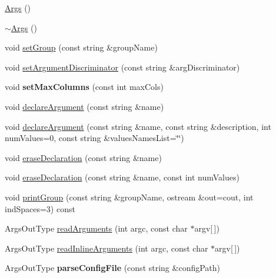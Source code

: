 \begin{DoxyCompactItemize}
\item 
\hyperlink{classnor__utils_1_1Args_ad9540079157b394ae075abf54c51c209}{Args} ()
\item 
\hyperlink{classnor__utils_1_1Args_a70b6504df66f800c4f3169609c01c028}{$\sim$Args} ()
\item 
void \hyperlink{classnor__utils_1_1Args_af15219ac6311908a29083c5b064fc7d2}{setGroup} (const string \&groupName)
\item 
void \hyperlink{classnor__utils_1_1Args_ae42b549afe0ad2294e004a6d30873015}{setArgumentDiscriminator} (const string \&argDiscriminator)
\item 
\hypertarget{classnor__utils_1_1Args_a5998493eb9c21b6033b0e168328bfdf8}{
void {\bfseries setMaxColumns} (const int maxCols)}
\label{classnor__utils_1_1Args_a5998493eb9c21b6033b0e168328bfdf8}

\item 
void \hyperlink{classnor__utils_1_1Args_a7ce6f583fb0bc0bd9ecd6f7942fa4076}{declareArgument} (const string \&name)
\item 
void \hyperlink{classnor__utils_1_1Args_a0460c8e358336253113799072f30d265}{declareArgument} (const string \&name, const string \&description, int numValues=0, const string \&valuesNamesList=\char`\"{}\char`\"{})
\item 
void \hyperlink{classnor__utils_1_1Args_ab6ccbab91c17b8fd2901f8463930f1c3}{eraseDeclaration} (const string \&name)
\item 
void \hyperlink{classnor__utils_1_1Args_aad24db65e91285a88e4506cf88084c5d}{eraseDeclaration} (const string \&name, const int numValues)
\item 
void \hyperlink{classnor__utils_1_1Args_a871ab0d7d08e07af69f6d7d4b3defa07}{printGroup} (const string \&groupName, ostream \&out=cout, int indSpaces=3) const 
\item 
ArgsOutType \hyperlink{classnor__utils_1_1Args_adf9e47567a34c429317c7823dc6b2181}{readArguments} (int argc, const char $\ast$argv\mbox{[}$\,$\mbox{]})
\item 
ArgsOutType \hyperlink{classnor__utils_1_1Args_abde1306618a3aa813873e8babb398dc0}{readInlineArguments} (int argc, const char $\ast$argv\mbox{[}$\,$\mbox{]})
\item 
\hypertarget{classnor__utils_1_1Args_a63df4ec9fc68631cf6629255db149f71}{
ArgsOutType {\bfseries parseConfigFile} (const string \&configPath)}
\label{classnor__utils_1_1Args_a63df4ec9fc68631cf6629255db149f71}


\end{DoxyCompactItemize}
